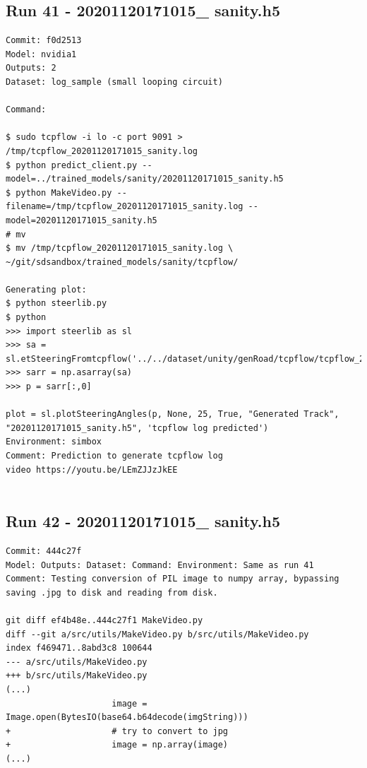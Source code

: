 \subsection{Run 41 - 20201120171015\_ sanity.h5}
\label{app_res:41}
\label{}
\begin{verbatim}
Commit: f0d2513
Model: nvidia1
Outputs: 2
Dataset: log_sample (small looping circuit)

Command: 

$ sudo tcpflow -i lo -c port 9091 > /tmp/tcpflow_20201120171015_sanity.log
$ python predict_client.py --model=../trained_models/sanity/20201120171015_sanity.h5
$ python MakeVideo.py --filename=/tmp/tcpflow_20201120171015_sanity.log --model=20201120171015_sanity.h5
# mv
$ mv /tmp/tcpflow_20201120171015_sanity.log \ 
~/git/sdsandbox/trained_models/sanity/tcpflow/

Generating plot:
$ python steerlib.py
$ python 
>>> import steerlib as sl
>>> sa = sl.etSteeringFromtcpflow('../../dataset/unity/genRoad/tcpflow/tcpflow_20201120171015_sanity.log')
>>> sarr = np.asarray(sa)
>>> p = sarr[:,0]

plot = sl.plotSteeringAngles(p, None, 25, True, "Generated Track", "20201120171015_sanity.h5", 'tcpflow log predicted')
Environment: simbox
Comment: Prediction to generate tcpflow log
video https://youtu.be/LEmZJJzJkEE


\end{verbatim}

\subsection{Run 42 - 20201120171015\_ sanity.h5}
\label{app_res:42}
\begin{verbatim}
Commit: 444c27f 
Model: Outputs: Dataset: Command: Environment: Same as run 41 
Comment: Testing conversion of PIL image to numpy array, bypassing saving .jpg to disk and reading from disk.

git diff ef4b48e..444c27f1 MakeVideo.py
diff --git a/src/utils/MakeVideo.py b/src/utils/MakeVideo.py
index f469471..8abd3c8 100644
--- a/src/utils/MakeVideo.py
+++ b/src/utils/MakeVideo.py
(...)
                     image = Image.open(BytesIO(base64.b64decode(imgString)))
+                    # try to convert to jpg
+                    image = np.array(image)
(...)



\end{verbatim}

